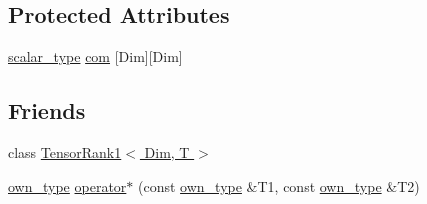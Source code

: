 \subsection*{Protected Attributes}
\begin{DoxyCompactItemize}
\item 
\hyperlink{classcofe_1_1TensorRank2_a3dce726b0c34912c6549a5911f478eaf}{scalar\-\_\-type} \hyperlink{classcofe_1_1TensorRank2_aa180922c86462cd1ecf2950f9c1ed80e}{com} \mbox{[}Dim\mbox{]}\mbox{[}Dim\mbox{]}
\end{DoxyCompactItemize}
\subsection*{Friends}
\begin{DoxyCompactItemize}
\item 
class \hyperlink{classcofe_1_1TensorRank2_a08e40e4ff7ed027f27ae8669ae3f5908}{Tensor\-Rank1$<$ Dim, T $>$}
\item 
\hyperlink{classcofe_1_1TensorRank2_afef4f2c69f8a804d795c334bc382dc5f}{own\-\_\-type} \hyperlink{classcofe_1_1TensorRank2_a94728a8371137490602713c44f6d3e52}{operator$\ast$} (const \hyperlink{classcofe_1_1TensorRank2_afef4f2c69f8a804d795c334bc382dc5f}{own\-\_\-type} \&T1, const \hyperlink{classcofe_1_1TensorRank2_afef4f2c69f8a804d795c334bc382dc5f}{own\-\_\-type} \&T2)
\end{DoxyCompactItemize}


